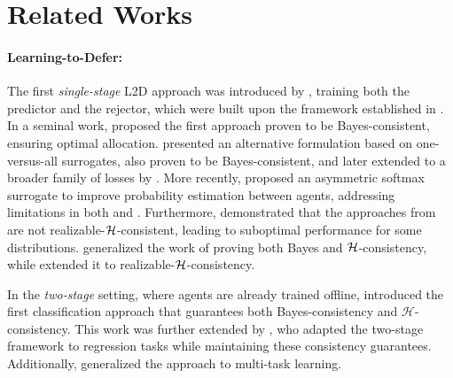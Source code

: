 \section{Related Works}


\paragraph{Learning-to-Defer:}  
The first \textit{single-stage} L2D approach was introduced by \citet{madras2018predict}, training both the predictor and the rejector, which were built upon the framework established in \citet{cortes}. In a seminal work, \citet{mozannar2021consistent} proposed the first approach proven to be Bayes-consistent, ensuring optimal allocation. \citet{Verma2022LearningTD} presented an alternative formulation based on one-versus-all surrogates, also proven to be Bayes-consistent, and later extended to a broader family of losses by \citet{charusaie2022sample}. More recently, \citet{Cao_Mozannar_Feng_Wei_An_2023} proposed an asymmetric softmax surrogate to improve probability estimation between agents, addressing limitations in both \citet{mozannar2021consistent} and \citet{Verma2022LearningTD}. Furthermore, \citet{Mozannar2023WhoSP} demonstrated that the approaches from \citet{mozannar2021consistent, Verma2022LearningTD} are not realizable-\(\mathcal{H}\)-consistent, leading to suboptimal performance for some distributions. \citet{mao2024principledapproacheslearningdefer} generalized the work of \citet{mozannar2021consistent} proving both Bayes and \(\mathcal{H}\)-consistency, while \citet{mao2024realizablehconsistentbayesconsistentloss} extended it to realizable-\(\mathcal{H}\)-consistency. 

In the \textit{two-stage} setting, where agents are already trained offline, \citet{mao2023twostage} introduced the first classification approach that guarantees both Bayes-consistency and \( \mathcal{H} \)-consistency. This work was further extended by \citet{mao2024regressionmultiexpertdeferral}, who adapted the two-stage framework to regression tasks while maintaining these consistency guarantees. Additionally, \citet{montreuil2024twostagelearningtodefermultitasklearning} generalized the approach to multi-task learning. 

